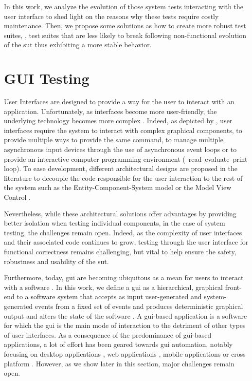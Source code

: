 In this work, we analyze the evolution of those system tests interacting with the user interface to shed light on the reasons why these tests require costly maintenance. Then, we propose some solutions as how to create more robust test suites, \ie, test suites that are less likely to break following non-functional evolution of the \gls{sut} thus exhibiting a more stable behavior.

\section{GUI Testing}
\label{sec:introduction-gui-testing}

User Interfaces are designed to provide a way for the user to interact with an application. Unfortunately, as interfaces become more user-friendly, the underlying technology becomes more complex \cite{Myers1994}. Indeed, as depicted by \textcite{Myers1995}, user interfaces require the system to  interact with complex graphical components, to provide multiple ways to provide the same command, to manage multiple asynchronous input devices through the use of asynchronous event loops or to provide an interactive computer programming environment (\eg\ read–evaluate–print loop). To ease development, different architectural designs are proposed in the literature to decouple the code responsible for the user interaction to the rest of the system such as the Entity-Component-System model \cite{Raffaillac2018} or the Model View Control \cite{Krasner1988}.

Nevertheless, while these architectural solutions offer advantages by providing better isolation when testing individual components, in the case of system testing, the challenges remain open. Indeed, as the complexity of user interfaces and their associated code continues to grow, testing through the user interface for functional correctness remains challenging, but vital to help ensure the safety, robustness and usability of the \gls{sut}.

Furthermore, today, \gls{gui} are becoming ubiquitous as a mean for users to interact with a software \cite{Myers1992, Myers1995, Brooks2009, Memon2010}. In this work, we define a \gls{gui} as a hierarchical, graphical front-end to a software system that accepts as input user-generated and system-generated events from a fixed set of events and produces deterministic graphical output \cite{Memon2007} and alters the state of the software \cite{Nguyen2014}. A \gls{gui}-based application is a software for which the \gls{gui} is the main mode of interaction to the detriment of other types of user interfaces. As a consequence of the predominance of \gls{gui}-based applications, a lot of effort has been geared towards \gls{gui} automation, notably focusing on desktop applications \cite{Nguyen2014, Advolodkin2018, Pezze2018}, web applications \cite{Mesbah2009, Biagiola2019}, mobile applications \cite{Machiry2013, Gomez2013, Mao2016, Salihu2019, Yu2019} or cross platform \cite{Canny2020}. However, as we show later in this section, major challenges remain open.

